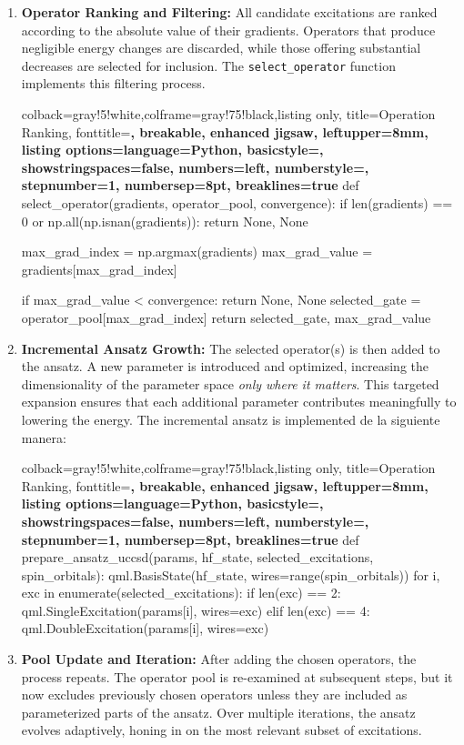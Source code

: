 \begin{enumerate}
    \item \textbf{Operator Ranking and Filtering:} All candidate excitations are ranked according to the absolute value of their gradients. Operators that produce negligible energy changes are discarded, while those offering substantial decreases are selected for inclusion. The \texttt{select\_operator} function implements this filtering process.
    \begin{tcblisting}{colback=gray!5!white,colframe=gray!75!black,listing only,
        title=Operation Ranking, fonttitle=\bfseries, breakable, enhanced jigsaw, leftupper=8mm,
        listing options={language=Python, basicstyle=\ttfamily\small,
        showstringspaces=false, numbers=left, numberstyle=\footnotesize, stepnumber=1, numbersep=8pt, breaklines=true}}
def select_operator(gradients, operator_pool, convergence):
    if len(gradients) == 0 or np.all(np.isnan(gradients)):
        return None, None

    max_grad_index = np.argmax(gradients)
    max_grad_value = gradients[max_grad_index]

    if max_grad_value < convergence:
        return None, None
    selected_gate = operator_pool[max_grad_index]
    return selected_gate, max_grad_value
      \end{tcblisting}
    \item \textbf{Incremental Ansatz Growth:} The selected operator(s) is then added to the ansatz. A new parameter is introduced and optimized, increasing the dimensionality of the parameter space \emph{only where it matters}. This targeted expansion ensures that each additional parameter contributes meaningfully to lowering the energy. The incremental ansatz is implemented de la siguiente manera:
    \begin{tcblisting}{colback=gray!5!white,colframe=gray!75!black,listing only,
        title=Operation Ranking, fonttitle=\bfseries, breakable, enhanced jigsaw, leftupper=8mm,
        listing options={language=Python, basicstyle=\ttfamily\small,
        showstringspaces=false, numbers=left, numberstyle=\footnotesize, stepnumber=1, numbersep=8pt, breaklines=true}}
def prepare_ansatz_uccsd(params, hf_state, selected_excitations, spin_orbitals):
    qml.BasisState(hf_state, wires=range(spin_orbitals))
    for i, exc in enumerate(selected_excitations):
        if len(exc) == 2:
            qml.SingleExcitation(params[i], wires=exc)
        elif len(exc) == 4:
            qml.DoubleExcitation(params[i], wires=exc)
      \end{tcblisting}
    \item \textbf{Pool Update and Iteration:} After adding the chosen operators, the process repeats. The operator pool is re-examined at subsequent steps, but it now excludes previously chosen operators unless they are included as parameterized parts of the ansatz. Over multiple iterations, the ansatz evolves adaptively, honing in on the most relevant subset of excitations.
\end{enumerate}

